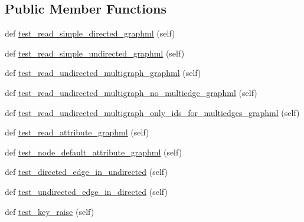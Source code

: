 \subsection*{Public Member Functions}
\begin{DoxyCompactItemize}
\item 
def \hyperlink{classnetworkx_1_1readwrite_1_1tests_1_1test__graphml_1_1TestReadGraphML_a5f9a73f26fdbb62687ce7c4fa12d0fff}{test\+\_\+read\+\_\+simple\+\_\+directed\+\_\+graphml} (self)
\item 
def \hyperlink{classnetworkx_1_1readwrite_1_1tests_1_1test__graphml_1_1TestReadGraphML_acb3088efbf7d45444a8507854259e8d8}{test\+\_\+read\+\_\+simple\+\_\+undirected\+\_\+graphml} (self)
\item 
def \hyperlink{classnetworkx_1_1readwrite_1_1tests_1_1test__graphml_1_1TestReadGraphML_a239fbe13cbfb3b4c2273a10102ef0a78}{test\+\_\+read\+\_\+undirected\+\_\+multigraph\+\_\+graphml} (self)
\item 
def \hyperlink{classnetworkx_1_1readwrite_1_1tests_1_1test__graphml_1_1TestReadGraphML_ab792df4afbdd5517325ea19eafd77556}{test\+\_\+read\+\_\+undirected\+\_\+multigraph\+\_\+no\+\_\+multiedge\+\_\+graphml} (self)
\item 
def \hyperlink{classnetworkx_1_1readwrite_1_1tests_1_1test__graphml_1_1TestReadGraphML_a622c8a7f2741d8cb0c79eeab25d9f8a3}{test\+\_\+read\+\_\+undirected\+\_\+multigraph\+\_\+only\+\_\+ids\+\_\+for\+\_\+multiedges\+\_\+graphml} (self)
\item 
def \hyperlink{classnetworkx_1_1readwrite_1_1tests_1_1test__graphml_1_1TestReadGraphML_a47dd32bd60f4d45ef27ad47a3c164b17}{test\+\_\+read\+\_\+attribute\+\_\+graphml} (self)
\item 
def \hyperlink{classnetworkx_1_1readwrite_1_1tests_1_1test__graphml_1_1TestReadGraphML_a4ac5a74f30321fb1a0175b581ce8ee2f}{test\+\_\+node\+\_\+default\+\_\+attribute\+\_\+graphml} (self)
\item 
def \hyperlink{classnetworkx_1_1readwrite_1_1tests_1_1test__graphml_1_1TestReadGraphML_a40e8c3146501c5e1da2d3e087619b2a7}{test\+\_\+directed\+\_\+edge\+\_\+in\+\_\+undirected} (self)
\item 
def \hyperlink{classnetworkx_1_1readwrite_1_1tests_1_1test__graphml_1_1TestReadGraphML_a43e5e8725815ce5801d0bb3397296c0e}{test\+\_\+undirected\+\_\+edge\+\_\+in\+\_\+directed} (self)
\item 
def \hyperlink{classnetworkx_1_1readwrite_1_1tests_1_1test__graphml_1_1TestReadGraphML_a08c62aa2aa65456f4a9fd79f28b16d91}{test\+\_\+key\+\_\+raise} (self)

\end{DoxyCompactItemize}
